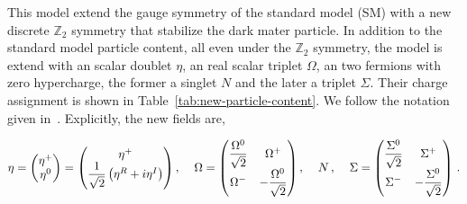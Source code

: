 \documentclass[12pt,letterpaper]{article}
\begin{document}
This model extend the gauge symmetry of the standard model (SM) with a new discrete $\mathbb{Z}_2$ symmetry that stabilize the dark mater particle. In addition to the standard model particle content, all even under the $\mathbb{Z}_2$ symmetry, the model is extend with an scalar doublet $\eta$, an real scalar triplet $\Omega$, an two fermions with zero hypercharge, the former a singlet $N$ and the later a triplet $\Sigma$. Their charge assignment is shown in Table~\ref{tab:new-particle-content}. We follow the notation given in~\cite{Merle:2016scw, Rocha-Moran:2016enp}. Explicitly, the new fields are,

\begin{align}
\eta = 
\begin{pmatrix}
\eta^+ \\
\eta^0
\end{pmatrix}
=\begin{pmatrix}
\eta^+ \\
\dfrac{1}{\sqrt{2}}\left(\eta^R+i\eta^I\right)
\end{pmatrix}, \;\hspace{0.3 cm}
\Omega = 
\begin{pmatrix}
\dfrac{\Omega^0}{\sqrt{2}} & \Omega^+ \\
\Omega^- & -\dfrac{\Omega^0}{\sqrt{2}}
\end{pmatrix}, \;\hspace{0.3 cm}
N\,, \;\hspace{0.3 cm}
\Sigma = 
\begin{pmatrix}
\dfrac{\Sigma^0}{\sqrt{2}} & \Sigma^+ \\
\Sigma^- & -\dfrac{\Sigma^0}{\sqrt{2}}
\end{pmatrix}\,.
\end{align}

   
\end{document}
